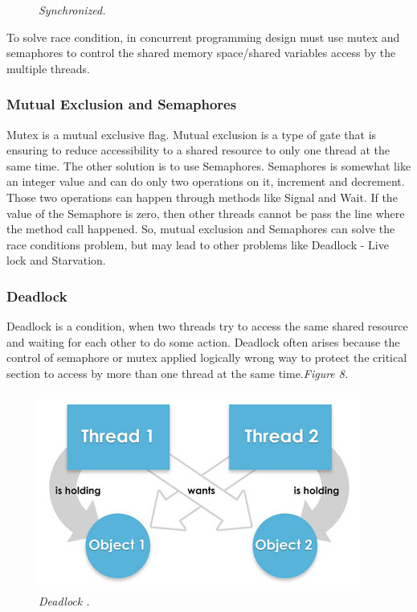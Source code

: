 \documentclass[12pt]{article}
\begin{document}
\begin{figure}[h!]
\begin{minipage}[h!]{0.4\textwidth}
    \caption{\textit{\color{gray}Synchronized\cite{Florian}.}}
  \end{minipage}
\end{figure}

To solve race condition, in concurrent programming design must use mutex and semaphores to control the shared memory space/shared variables access by the multiple threads.

	\subsubsection{Mutual Exclusion and Semaphores}
Mutex is a mutual exclusive flag. Mutual exclusion is a type of gate that is ensuring to reduce accessibility to a shared resource to only one thread at the same time. The other solution is to use Semaphores. Semaphores is somewhat like an integer value and can do only two operations on it, increment and decrement. Those two operations can happen through methods like Signal and Wait. If the value of the Semaphore is zero, then other threads cannot be pass the line where the method call happened.\citep{Nick&Julie}
So, mutual exclusion and Semaphores can solve the race conditions problem, but may lead to other problems like Deadlock - Live lock and Starvation.

	\subsubsection{Deadlock}
Deadlock is a condition, when two threads try to access the same shared resource and waiting for each other to do some action. Deadlock often arises because the control of semaphore or mutex applied logically wrong way to protect the critical section to access by more than one thread at the same time.\textit{\color{gray}Figure 8.}

\begin{figure}[h!]
\centering
\includegraphics[scale=0.5]{Pictures/deadlock.png}
\caption{\textit{\color{gray}Deadlock \cite{Paul}.}}
\end{figure}
\end{document}
